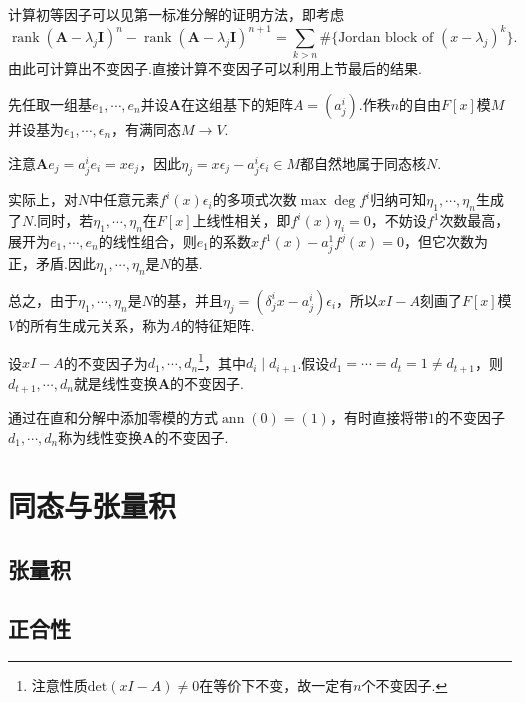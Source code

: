 计算初等因子可以见第一标准分解的证明方法，即考虑
\[
    \operatorname*{rank}(\bm A-\lambda_j\bm I)^n-\operatorname*{rank}(\bm A-\lambda_j\bm I)^{n+1}=\sum_{k>n}\#\{\text{Jordan block of }(x-\lambda_j)^k\}.
\]
由此可计算出不变因子.直接计算不变因子可以利用上节最后的结果.

先任取一组基$e_1,\cdots,e_n$并设$\bm A$在这组基下的矩阵$A=(a^i_j)$.作秩$n$的自由$F[x]$模$M$并设基为$\epsilon_1,\cdots,\epsilon_n$，有满同态$M\to V$.

注意$\bm Ae_j=a^i_je_i=xe_j$，因此$\eta_j=x\epsilon_j-a^i_j\epsilon_i\in M$都自然地属于同态核$N$.

\begin{remark}
    实际上，对$N$中任意元素$f^i(x)\epsilon_i$的多项式次数$\max\deg f^i$归纳可知$\eta_1,\cdots,\eta_n$生成了$N$.同时，若$\eta_1,\cdots,\eta_n$在$F[x]$上线性相关，即$f^i(x)\eta_i=0$，不妨设$f^1$次数最高，展开为$e_1,\cdots,e_n$的线性组合，则$e_1$的系数$xf^1(x)-a^1_jf^j(x)=0$，但它次数为正，矛盾.因此$\eta_1,\cdots,\eta_n$是$N$的基.
\end{remark}

总之，由于$\eta_1,\cdots,\eta_n$是$N$的基，并且$\eta_j=(\delta^i_jx-a^i_j)\epsilon_i$，所以$xI-A$刻画了$F[x]$模$V$的所有生成元关系，称为$A$的{\heiti 特征矩阵}.

设$xI-A$的不变因子为$d_1,\cdots,d_n$\footnote{注意性质$\mathrm{det}(xI-A)\ne 0$在等价下不变，故一定有$n$个不变因子.}，其中$d_i\mid d_{i+1}$.假设$d_1=\cdots=d_t=1\ne d_{t+1}$，则$d_{t+1},\cdots,d_n$就是线性变换$\bm A$的不变因子.

\begin{remark}
    通过在直和分解中添加零模的方式$\operatorname*{ann}(0)=(1)$，有时直接将带$1$的不变因子$d_1,\cdots,d_n$称为线性变换$\bm A$的不变因子.
\end{remark}

\section{同态与张量积}
\subsection{张量积}

\subsection{正合性}
